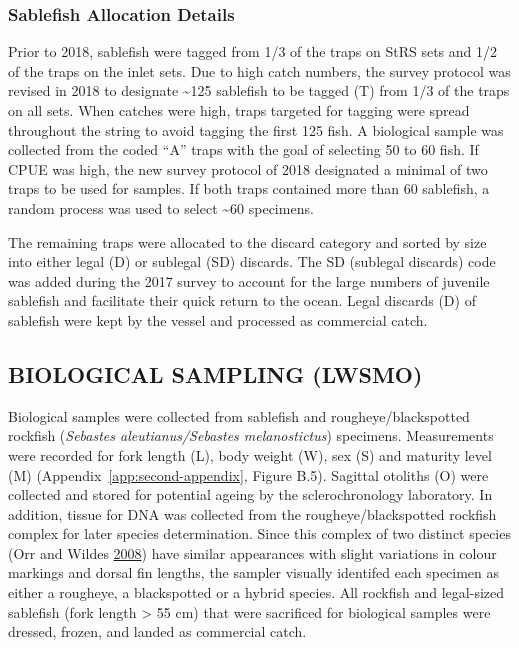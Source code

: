 \documentclass[12pt]{article}\usepackage[]{graphicx}\usepackage[]{color}
\begin{document}
\hypertarget{sablefish-allocation-details}{%
\subsubsection{Sablefish Allocation Details}\label{sablefish-allocation-details}}

Prior to 2018, sablefish were tagged from 1/3 of the traps on StRS sets and 1/2 of the traps on the inlet sets. Due to high catch numbers, the survey protocol was revised in 2018 to designate \textasciitilde125 sablefish to be tagged (T) from 1/3 of the traps on all sets. When catches were high, traps targeted for tagging were spread throughout the string to avoid tagging the first 125 fish. A biological sample was collected from the coded ``A'' traps with the goal of selecting 50 to 60 fish. If CPUE was high, the new survey protocol of 2018 designated a minimal of two traps to be used for samples. If both traps contained more than 60 sablefish, a random process was used to select \textasciitilde60 specimens.

The remaining traps were allocated to the discard category and sorted by size into either legal (D) or sublegal (SD) discards. The SD (sublegal discards) code was added during the 2017 survey to account for the large numbers of juvenile sablefish and facilitate their quick return to the ocean. Legal discards (D) of sablefish were kept by the vessel and processed as commercial catch.

\hypertarget{biological-sampling-lwsmo}{%
\subsection{BIOLOGICAL SAMPLING (LWSMO)}\label{biological-sampling-lwsmo}}

Biological samples were collected from sablefish and rougheye/blackspotted rockfish (\emph{Sebastes aleutianus/Sebastes melanostictus}) specimens. Measurements were recorded for fork length (L), body weight (W), sex (S) and maturity level (M) (Appendix~\ref{app:second-appendix}, Figure B.5). Sagittal otoliths (O) were collected and stored for potential ageing by the sclerochronology laboratory. In addition, tissue for DNA was collected from the rougheye/blackspotted rockfish complex for later species determination. Since this complex of two distinct species (Orr and Wildes \protect\hyperlink{ref-Orr2008}{2008}) have similar appearances with slight variations in colour markings and dorsal fin lengths, the sampler visually identifed each specimen as either a rougheye, a blackspotted or a hybrid species. All rockfish and legal-sized sablefish (fork length \textgreater{} 55 cm) that were sacrificed for biological samples were dressed, frozen, and landed as commercial catch.
\end{document}
